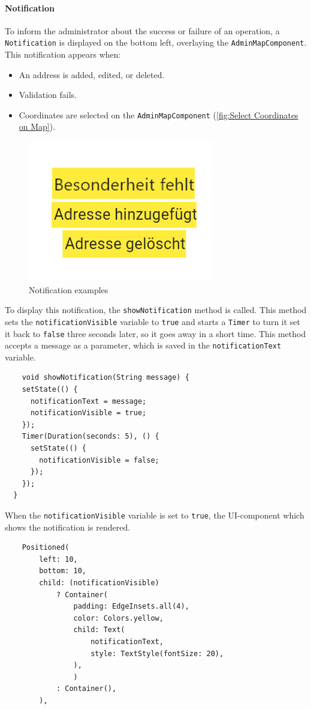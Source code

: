 \paragraph{Notification}
\label{fig:Notification}

    To inform the administrator about the success or failure of an operation, a \texttt{Notification} is displayed on the bottom left, overlaying the \texttt{AdminMapComponent}. This notification appears when:

    \begin{itemize}
        \item An address is added, edited, or deleted.
        \item Validation fails.
        \item Coordinates are selected on the \texttt{AdminMapComponent} (\ref{fig:Select Coordinates on Map}).
        \end{itemize}


\begin{figure}[H]
    \centering
    \includegraphics[width=0.4\linewidth]{images/AdminPanel/NotificationExamples.png}
    \caption{Notification examples}
\end{figure}

To display this notification, the \texttt{showNotification} method is called. This method sets the \texttt{notificationVisible} variable to \texttt{true} and starts a \texttt{Timer} to turn it set it back to \texttt{false} three seconds later, so it goes away in a short time. This method accepts a message as a parameter, which is saved in the \texttt{notificationText} variable.
\lstset{style=mycsharp, caption=showNotification method}
\begin{lstlisting}
    void showNotification(String message) {
    setState(() {
      notificationText = message;
      notificationVisible = true;
    }); 
    Timer(Duration(seconds: 5), () {
      setState(() {
        notificationVisible = false;
      });
    });
  }
\end{lstlisting}

When the \texttt{notificationVisible} variable is set to \texttt{true}, the UI-component which shows the notification is rendered.
\lstset{style=mycsharp, caption=Notification in AddressPage}
\begin{lstlisting}
    Positioned(
        left: 10,
        bottom: 10,
        child: (notificationVisible)
            ? Container(
                padding: EdgeInsets.all(4),
                color: Colors.yellow,
                child: Text(
                    notificationText,
                    style: TextStyle(fontSize: 20),
                ),
                )
            : Container(),
        ),
\end{lstlisting}

